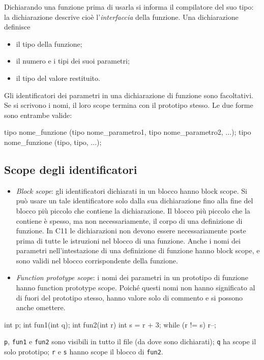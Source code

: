 \documentclass[11pt,a4paper]{article}
\begin{document}
Dichiarando una funzione prima di usarla si informa il compilatore del suo tipo: la dichiarazione descrive cioè l'\emph{interfaccia} della funzione. Una dichiarazione definisce
\begin{itemize}
    \item il tipo della funzione;
    \item il numero e i tipi dei suoi parametri;
    \item il tipo del valore restituito.
\end{itemize}
Gli identificatori dei parametri in una dichiarazione di funzione sono facoltativi. Se si scrivono i nomi, il loro scope termina con il prototipo stesso. Le due forme sono entrambe valide:
\begin{codice}
tipo nome_funzione (tipo nome_parametro1, tipo nome_parametro2, ...);
tipo nome_funzione (tipo, tipo, ...);
\end{codice}

\subsection{Scope degli identificatori}

\begin{itemize}
    \item \emph{Block scope}: gli identificatori dichiarati in un blocco hanno block scope. Si può usare un tale identificatore solo dalla sua dichiarazione fino alla fine del blocco più piccolo che contiene la dichiarazione. Il blocco più piccolo che la contiene è spesso, ma non necessariamente, il corpo di una definizione di funzione. In C11 le dichiarazioni non devono essere necessariamente poste prima di tutte le istruzioni nel blocco di una funzione. Anche i nomi dei parametri nell'intestazione di una definizione di funzione hanno block scope, e sono validi nel blocco corrispondente della funzione.
    \item \emph{Function prototype scope}: i nomi dei parametri in un prototipo di funzione hanno function prototype scope. Poiché questi nomi non hanno significato al di fuori del prototipo stesso, hanno valore solo di commento e si possono anche omettere.
\end{itemize}

\begin{esempio}
\begin{codice}
int p;
int fun1(int q);
int fun2(int r)
{
    int s = r + 3;
    while (r != s)
        r--;
}
\end{codice}
\lstinline|p|, \lstinline|fun1| e \lstinline|fun2| sono visibili in tutto il file (da dove sono dichiarati); \lstinline|q| ha scope il solo prototipo; \lstinline|r| e \lstinline|s| hanno scope il blocco di \lstinline|fun2|.
\end{esempio}
\end{document}
